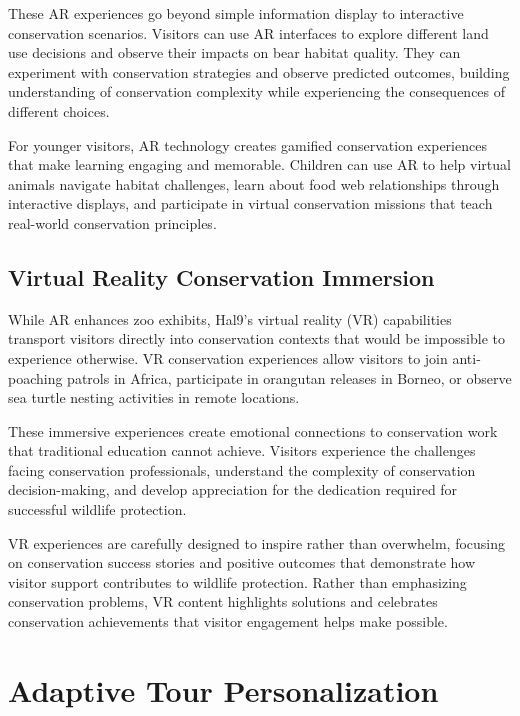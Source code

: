 \documentclass[
  Letterpaper,
]{scrbook}
\begin{document}
These AR experiences go beyond simple information display to interactive
conservation scenarios. Visitors can use AR interfaces to explore
different land use decisions and observe their impacts on bear habitat
quality. They can experiment with conservation strategies and observe
predicted outcomes, building understanding of conservation complexity
while experiencing the consequences of different choices.

For younger visitors, AR technology creates gamified conservation
experiences that make learning engaging and memorable. Children can use
AR to help virtual animals navigate habitat challenges, learn about food
web relationships through interactive displays, and participate in
virtual conservation missions that teach real-world conservation
principles.

\subsection{Virtual Reality Conservation
Immersion}\label{virtual-reality-conservation-immersion}

While AR enhances zoo exhibits, Hal9's virtual reality (VR) capabilities
transport visitors directly into conservation contexts that would be
impossible to experience otherwise. VR conservation experiences allow
visitors to join anti-poaching patrols in Africa, participate in
orangutan releases in Borneo, or observe sea turtle nesting activities
in remote locations.

These immersive experiences create emotional connections to conservation
work that traditional education cannot achieve. Visitors experience the
challenges facing conservation professionals, understand the complexity
of conservation decision-making, and develop appreciation for the
dedication required for successful wildlife protection.

VR experiences are carefully designed to inspire rather than overwhelm,
focusing on conservation success stories and positive outcomes that
demonstrate how visitor support contributes to wildlife protection.
Rather than emphasizing conservation problems, VR content highlights
solutions and celebrates conservation achievements that visitor
engagement helps make possible.

\section{Adaptive Tour
Personalization}\label{adaptive-tour-personalization}
\end{document}
